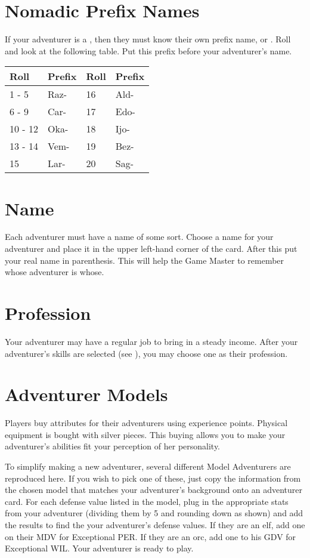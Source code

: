 \begin{multicols*}{2}
\section{Nomadic Prefix Names}
If your adventurer is a , then they must know their own prefix name, or . Roll  and look at the following table. Put this prefix before your adventurer's name.
\vspace{-15pt}
\begin{normbox}
\begin{tabular}{l l|l l}
\small
Roll & Prefix & Roll & Prefix\\
\midrule
1 - 5 & Raz- & 16 & Ald-\\
6 - 9 & Car- & 17 & Edo-\\
10 - 12 & Oka- & 18 & Ijo-\\
13 - 14 & Vem- & 19 & Bez-\\
15 & Lar- & 20 & Sag-\\
\end{tabular}
\end{normbox}
\setlength{\columnsep}{0.25cm}
\section{Name}
Each adventurer must have a name of some sort. Choose a name for your adventurer and place it in the upper left-hand corner of the card. After this put your real name in parenthesis. This will help the Game Master to remember whose adventurer is whose.
\section{Profession}
Your adventurer may have a regular job to bring in a steady income. After your adventurer's skills are selected (see \tcpage{\pageref{create-skills}}), you may choose one as their profession.
\section{Adventurer Models}
Players buy attributes for their adventurers using experience points. Physical equipment is bought with silver pieces. This buying allows you to make your adventurer's abilities fit your perception of her personality.

To simplify making a new adventurer, several different Model Adventurers are reproduced here. If you wish to pick one of these, just copy the information from the chosen model that matches your adventurer's background onto an adventurer card. For each defense value listed in the model, plug in the appropriate stats from your adventurer (dividing them by 5 and rounding down as shown) and add the results to find the your adventurer's defense values. If they are an elf, add one on their MDV for Exceptional PER. If they are an orc, add one to his GDV for Exceptional WIL. Your adventurer is ready to play.


\end{multicols*}
